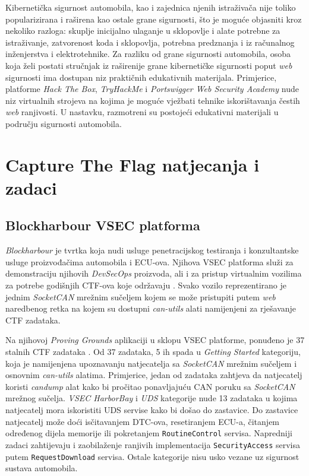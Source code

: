 \documentclass[times, utf8, diplomski, numeric]{fer}
\begin{document}
Kibernetička sigurnost automobila, kao i zajednica njenih istraživača nije toliko popularizirana i raširena kao ostale grane sigurnosti, što je moguće objasniti kroz nekoliko razloga: skuplje inicijalno ulaganje u sklopovlje i alate potrebne za istraživanje, zatvorenost koda i sklopovlja, potrebna predznanja i iz računalnog inženjerstva i elektrotehnike. Za razliku od grane sigurnosti automobila, osoba koja želi postati stručnjak iz raširenije grane kibernetičke sigurnosti poput \textit{web} sigurnosti ima dostupan niz praktičnih edukativnih materijala. Primjerice, platforme \textit{Hack The Box}, \textit{TryHackMe} i \textit{Portswigger Web Security Academy} nude niz virtualnih strojeva na kojima je moguće vježbati tehnike iskorištavanja čestih \textit{web} ranjivosti. U nastavku, razmotreni su postojeći edukativni materijali u području sigurnosti automobila. 


\section{Capture The Flag natjecanja i zadaci}
\subsection{Blockharbour VSEC platforma}
\textit{Blockharbour} je tvrtka koja nudi usluge penetracijskog testiranja i konzultantske usluge proizvođačima automobila i ECU-ova. Njihova VSEC platforma služi za demonstraciju njihovih \textit{DevSecOps} proizvoda, ali i za pristup virtualnim vozilima za potrebe godišnjih CTF-ova koje održavaju \cite{bhvsec}. Svako vozilo reprezentirano je jednim \textit{SocketCAN} mrežnim sučeljem kojem se može pristupiti putem \textit{web} naredbenog retka na kojem su dostupni \textit{can-utils} alati namijenjeni za rješavanje CTF zadataka.

Na njihovoj \textit{Proving Grounds} aplikaciji u sklopu VSEC platforme, ponuđeno je 37 stalnih CTF zadataka \cite{bhprovinggrounds}. Od 37 zadataka, 5 ih spada u \textit{Getting Started} kategoriju, koja je namijenjena upoznavanju natjecatelja sa \textit{SocketCAN} mrežnim sučeljem i osnovnim \textit{can-utils} alatima. Primjerice, jedan od zadataka zahtjeva da natjecatelj koristi \textit{candump} alat kako bi pročitao ponavljajuću CAN poruku sa \textit{SocketCAN} mrežnog sučelja. \textit{VSEC HarborBay} i \textit{UDS} kategorije nude 13 zadataka u kojima natjecatelj mora iskoristiti UDS servise kako bi došao do zastavice. Do zastavice natjecatelj može doći isčitavanjem DTC-ova, resetiranjem ECU-a, čitanjem određenog dijela memorije ili pokretanjem \texttt{RoutineControl} servisa. Napredniji zadaci zahtijevaju i zaobilaženje ranjivih implementacija \texttt{SecurityAccess} servisa putem \texttt{RequestDownload} servisa. Ostale kategorije nisu usko vezane uz sigurnost sustava automobila.
\end{document}
